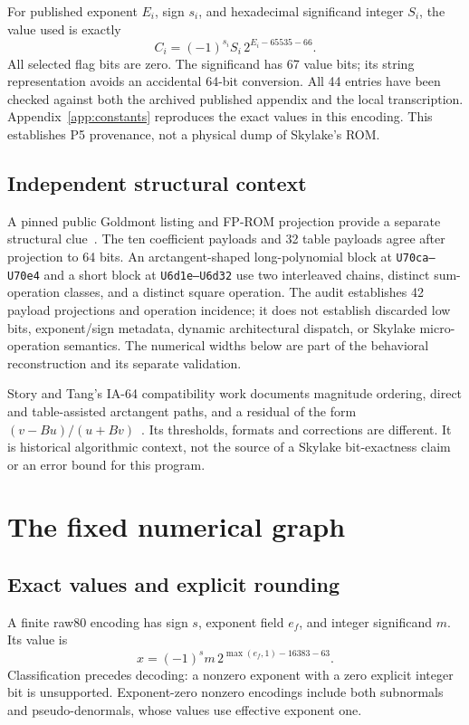 \documentclass[11pt]{article}
\newcommand{\hex}[1]{\texttt{#1}}
\begin{document}
For published exponent $E_i$, sign $s_i$, and hexadecimal significand
integer $S_i$, the value used is exactly
\begin{equation}
 C_i=(-1)^{s_i} S_i\,2^{E_i-65535-66}.
 \label{eq:rom}
\end{equation}
All selected flag bits are zero. The significand has 67 value bits; its
string representation avoids an accidental 64-bit conversion. All 44
entries have been checked against both the archived published appendix and
the local transcription. Appendix~\ref{app:constants} reproduces the exact
values in this encoding. This establishes P5 provenance, not a physical
dump of Skylake's ROM.

\subsection{Independent structural context}

A pinned public Goldmont listing and FP-ROM projection provide a separate
structural clue~\cite{goldmont,fprom}. The ten coefficient payloads and 32
table payloads agree after projection to 64 bits. An arctangent-shaped
long-polynomial block at \hex{U70ca--U70e4} and a short block at
\hex{U6d1e--U6d32} use two interleaved chains, distinct sum-operation classes,
and a distinct square operation. The audit establishes 42 payload
projections and operation incidence; it does not establish discarded low
bits, exponent/sign metadata, dynamic architectural dispatch, or Skylake
micro-operation semantics. The numerical widths below are part of the
behavioral reconstruction and its separate validation.

Story and Tang's IA-64 compatibility work documents magnitude ordering,
direct and table-assisted arctangent paths, and a residual of the form
$(v-Bu)/(u+Bv)$~\cite{story}. Its thresholds, formats and corrections are
different. It is historical algorithmic context, not the source of a
Skylake bit-exactness claim or an error bound for this program.

\section{The fixed numerical graph}
\label{sec:graph}

\subsection{Exact values and explicit rounding}

A finite raw80 encoding has sign $s$, exponent field $e_f$, and integer
significand $m$. Its value is
\begin{equation}
 x=(-1)^s m\,2^{\max(e_f,1)-16383-63}.
\end{equation}
Classification precedes decoding: a nonzero exponent with a zero explicit
integer bit is unsupported. Exponent-zero nonzero encodings include both
subnormals and pseudo-denormals, whose values use effective exponent one.
\end{document}

